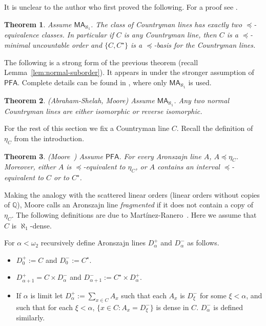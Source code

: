 \documentclass[10pt]{amsart}
\newtheorem{theorem}{Theorem}[section]
\theoremstyle{definition}
\theoremstyle{remark}
\newcommand{\axiom}[1]{\mathsf{#1}}
\newcommand{\MA}{\axiom{MA}}
\newcommand{\PFA}{\axiom{PFA}}
\newcommand{\eleq}{\preceq}
\newcommand{\1}{\mathbbm{1}}
\begin{document}
It is unclear to the author who first proved the following.
For a proof see \cite[2.1.12 and 2.1.13]{TodorcevicWalks}.

\begin{theorem}\label{thm:clines-equiv}
  Assume $\MA_{\aleph_{1}}$. The class of Countryman
  lines has exactly two $\eleq$-equivalence classes. In particular
  if $C$ is any Countryman line, then $C$ is a $\eleq$-minimal uncountable
  order and $\{C,C^{\star}\}$ is a $\eleq$-basis for the Countryman lines.
\end{theorem}

The following is a strong form of the previous theorem (recall
Lemma~\ref{lem:normal-suborder}). It appears in \cite{ShelahAbraham}
under the stronger assumption of $\PFA$. Complete details can be found
in \cite{Moore2009}, where only $\MA_{\aleph_{1}}$ is used.

\begin{theorem}\label{thm:moore-t1.1} (Abraham-Shelah, Moore)
  Assume $\MA_{\aleph_{1}}$.
  Any two normal Countryman lines are either isomorphic or reverse isomorphic.
\end{theorem}

For the rest of this section we fix a Countryman line $C$. Recall
the definition of $\eta_{C}$ from the introduction.

\begin{theorem}\label{thm:univ-aline-strong} (Moore~\cite{Moore2009})
  Assume $\PFA$. For every Aronszajn line $A$,
  $A \eleq \eta_{C}$. Moreover, either
  $A$ is $\eleq$-equivalent to $\eta_{C}$, or $A$ contains an interval
  $\eleq$-equivalent to $C$ or to $C^{\star}$.
\end{theorem}

Making the analogy with the scattered linear orders (linear orders without copies
of $\mathbb{Q}$), Moore calls an Aronszajn line
\emph{fragmented} if it does not contain a copy of $\eta_{C}$.
The following definitions
are due to Martínez-Ranero~\cite{Martinez}. Here we assume that $C$ is $\aleph_{1}$-dense.

For $\alpha < \omega_{2}$ recursively define Aronszajn lines
$D_{\alpha}^{+}$ and $D_{\alpha}^{-}$ as follows.
\begin{itemize}\itemsep0em
  \item $D_{0}^{+} := C$ and $D_{0}^{-} := C^{\star}$.
  \item $D_{\alpha+1}^{+} = C \times D_{\alpha}^{-}$ and
  $D_{\alpha+1}^{-} := C^{\star} \times D_{\alpha}^{+}$.
  \item If $\alpha$ is limit let
  $D_{\alpha}^{+} := \sum_{x \in C}A_{x}$ such that each $A_{x}$ is
  $D_{\xi}^{-}$ for some $\xi < \alpha$, and such that
  for each $\xi < \alpha$, $\{x \in C : A_{x}= D_{\xi}^{-}\}$ is dense
  in $C$. $D_{\alpha}^{-}$ is defined similarly.
\end{itemize}
\end{document}
